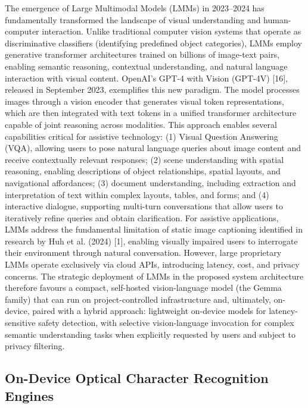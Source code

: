 \documentclass[12pt,a4paper]{report}
\begin{document}
The emergence of Large Multimodal Models (LMMs) in 2023--2024 has fundamentally transformed the landscape of visual understanding and human-computer interaction. Unlike traditional computer vision systems that operate as discriminative classifiers (identifying predefined object categories), LMMs employ generative transformer architectures trained on billions of image-text pairs, enabling semantic reasoning, contextual understanding, and natural language interaction with visual content. OpenAI's GPT-4 with Vision (GPT-4V) [16], released in September 2023, exemplifies this new paradigm. The model processes images through a vision encoder that generates visual token representations, which are then integrated with text tokens in a unified transformer architecture capable of joint reasoning across modalities. This approach enables several capabilities critical for assistive technology: (1) Visual Question Answering (VQA), allowing users to pose natural language queries about image content and receive contextually relevant responses; (2) scene understanding with spatial reasoning, enabling descriptions of object relationships, spatial layouts, and navigational affordances; (3) document understanding, including extraction and interpretation of text within complex layouts, tables, and forms; and (4) interactive dialogue, supporting multi-turn conversations that allow users to iteratively refine queries and obtain clarification. For assistive applications, LMMs address the fundamental limitation of static image captioning identified in research by Huh et al. (2024) [1], enabling visually impaired users to interrogate their environment through natural conversation. However, large proprietary LMMs operate exclusively via cloud APIs, introducing latency, cost, and privacy concerns. The strategic deployment of LMMs in the proposed system architecture therefore favours a compact, self-hosted vision-language model (the Gemma family) that can run on project-controlled infrastructure and, ultimately, on-device, paired with a hybrid approach: lightweight on-device models for latency-sensitive safety detection, with selective vision-language invocation for complex semantic understanding tasks when explicitly requested by users and subject to privacy filtering.

\subsection{On-Device Optical Character Recognition Engines}
\end{document}
